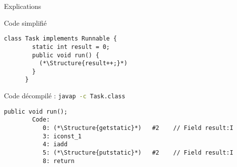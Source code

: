 
\begingroup

\begin{frame}[fragile]{Explications}

  \begin{block}{Code simplifié}
    \begin{lstlisting}[gobble=4]
      class Task implements Runnable {
        static int result = 0;
        public void run() {
          (*\Structure{result++;}*)
        }
      }
    \end{lstlisting}
  \end{block}

  \pause

  \begin{block}{Code décompilé : \lstinline[language=bash]{javap -c Task.class}}
    \begin{lstlisting}[gobble=4]
      public void run();
        Code:
           0: (*\Structure{getstatic}*)   #2    // Field result:I
           3: iconst_1
           4: iadd
           5: (*\Structure{putstatic}*)   #2    // Field result:I
           8: return
    \end{lstlisting}

  \end{block}

\end{frame}

\endgroup
\endinput
